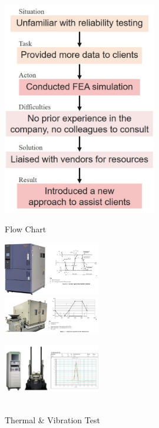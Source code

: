 \documentclass[10pt, letterpaper]{article}
\begin{document}
    \begin{figure}[!b]
        \vspace{-1.8 cm} 
        \begin{minipage}[c]{0.33\linewidth}
            \centering
            \includegraphics[width=0.6\textwidth]{fig/SGS Intern/SGS流程圖.jpg}
            \caption{Flow Chart}
        \end{minipage}%
        \begin{minipage}[c]{0.33\linewidth}
            \centering
            \includegraphics[width=4.2cm]{fig/SGS Intern/Thermal Test.jpg} \\
            \includegraphics[width=4.2cm]{fig/SGS Intern/Vibration Test.jpg}
            \caption{\\Thermal \& Vibration Test}
        \end{minipage}%
        \begin{minipage}[c]{0.33\linewidth}
            \centering
            \includegraphics[width=4.2cm]{fig/SGS Intern/Shock Test.jpg} \\

\end{minipage}
\end{figure}
\end{document}
